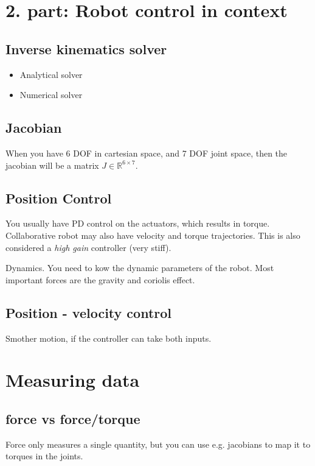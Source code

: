 \documentclass[a4paper]{article}
\begin{document}
\newpage

\section{2. part: Robot control in context}

\subsection{Inverse kinematics solver}

\begin{itemize}
	\item Analytical solver
	\item Numerical solver
\end{itemize}

\subsection{Jacobian}
When you have 6 DOF in cartesian space, and 7 DOF joint space, then the jacobian will be a matrix $ J \in \mathbb{R}^{6 \times 7} $. 


\subsection{Position Control}
You usually have PD control on the actuators, which results in torque. Collaborative robot may also have velocity and torque trajectories. This is also considered a \textit{high gain} controller (very stiff). 

Dynamics. You need to kow the dynamic parameters of the robot. Most important forces are the gravity and coriolis effect. 

\subsection{Position - velocity control}
Smother motion, if the controller can take both inputs.


\section{Measuring data}
\subsection{force vs force/torque}
Force only measures a single quantity, but you can use e.g. jacobians to map it to torques in the joints. 
\end{document}
